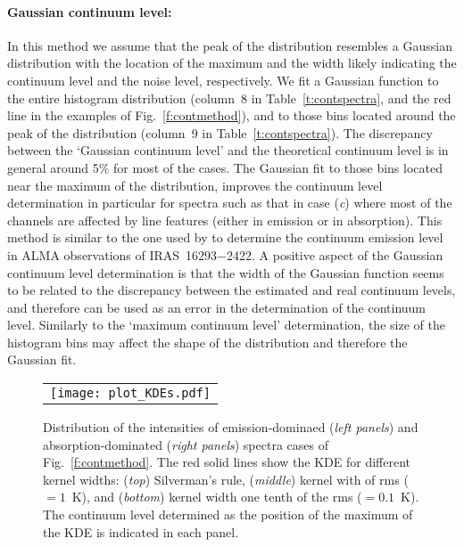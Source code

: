 \documentclass{aa}
\begin{document}
\paragraph{\textbf{Gaussian continuum level}:}
In this method we assume that the peak of the distribution resembles a Gaussian distribution with the location of the maximum and the width likely indicating the continuum level and the noise level, respectively. We fit a Gaussian function to the entire histogram distribution (column~8 in Table~\ref{t:contspectra}, and the red line in the examples of Fig.~\ref{f:contmethod}), and to those bins located around the peak of the distribution (column~9 in Table~\ref{t:contspectra}). The discrepancy between the `Gaussian continuum level' and the theoretical continuum level is in general around 5\% for most of the cases. The Gaussian fit to those bins located near the maximum of the distribution, improves the continuum level determination in particular for spectra such as that in case (\textit{c}) where most of the channels are affected by line features (either in emission or in absorption). This method is similar to the one used by \citet{Jorgensen2016} to determine the continuum emission level in ALMA observations of IRAS~16293$-$2422. A positive aspect of the Gaussian continuum level determination is that the width of the Gaussian function seems to be related to the discrepancy between the estimated and real continuum levels, and therefore can be used as an error in the determination of the continuum level. Similarly to the `maximum continuum level' determination, the size of the histogram bins may affect the shape of the distribution and therefore the Gaussian fit.

\begin{figure}[t]
\begin{center}
\begin{tabular}[b]{c}
        \texttt{[image: plot\_KDEs.pdf]} \\
\end{tabular}
\caption{Distribution of the intensities of emission-dominaed (\textit{left panels}) and absorption-dominated (\textit{right panels}) spectra cases of Fig.~\ref{f:contmethod}. The red solid lines show the KDE for different kernel widths: (\textit{top}) Silverman's rule, (\textit{middle}) kernel with of rms ($=1$~K), and (\textit{bottom}) kernel width one tenth of the rms ($=0.1$~K). The continuum level determined as the position of the maximum of the KDE is indicated in each panel.}
\label{f:KDEs}
\end{center}
\end{figure}
\end{document}

